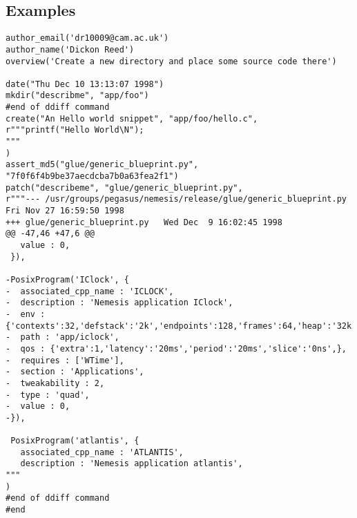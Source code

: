 \documentclass{article}
\begin{document}
\subsection{Examples}

\begin{verbatim}
author_email('dr10009@cam.ac.uk')
author_name('Dickon Reed')
overview('Create a new directory and place some source code there')

date("Thu Dec 10 13:13:07 1998")
mkdir("describme", "app/foo")
#end of ddiff command
create("An Hello world snippet", "app/foo/hello.c",
r"""printf("Hello World\N");
"""
)
assert_md5("glue/generic_blueprint.py", "7f0f6f4b9be37aecdcba7b0a63fea2f1")
patch("describeme", "glue/generic_blueprint.py",
r"""--- /usr/groups/pegasus/nemesis/release/glue/generic_blueprint.py	Fri Nov 27 16:59:50 1998
+++ glue/generic_blueprint.py	Wed Dec  9 16:02:45 1998
@@ -47,46 +47,6 @@
   value : 0,
 }),
 
-PosixProgram('IClock', {
-  associated_cpp_name : 'ICLOCK',
-  description : 'Nemesis application IClock',
-  env : {'contexts':32,'defstack':'2k','endpoints':128,'frames':64,'heap':'32k','kernel':0,'sysheap':'8k',},
-  path : 'app/iclock',
-  qos : {'extra':1,'latency':'20ms','period':'20ms','slice':'0ns',},
-  requires : ['WTime'],
-  section : 'Applications',
-  tweakability : 2,
-  type : 'quad',
-  value : 0,
-}),

 PosixProgram('atlantis', {
   associated_cpp_name : 'ATLANTIS',
   description : 'Nemesis application atlantis',
"""
)
#end of ddiff command
#end
\end{verbatim}
\end{document}
